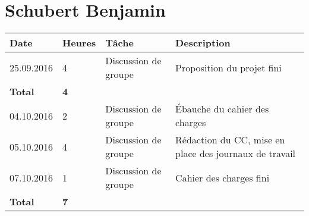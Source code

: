\documentclass[french]{article}
\begin{document}
	\section*{Schubert Benjamin}
	\begin{longtable}{p{}|p{}|p{}|p{}}
		Date&Heures&Tâche&Description\\
		\hline \hline
		25.09.2016 & 4 & Discussion de groupe & Proposition du projet fini\\
		\textbf{Total} & \textbf{4} &&\\
		\hline
		04.10.2016 & 2 & Discussion de groupe & Ébauche du cahier des charges\\
		05.10.2016 & 4 & Discussion de groupe & Rédaction du CC, mise en place des journaux de travail\\
		07.10.2016 & 1 & Discussion de groupe & Cahier des charges fini\\
		\textbf{Total} & \textbf{7} &&\\
		\hline
	\end{longtable}
	
\end{document}

